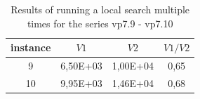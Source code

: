 \documentclass{ifacconf}
\begin{document}
\begin{table}[ht]
	\centering
	\begin{tabular}{|c|c|c|c|}
		\hline
		\hspace*{0.1cm}instance \hspace*{0.1cm} &
		\hspace*{0.1cm}$V1$\hspace*{0.1cm}&
		\hspace*{0.1cm}$V2$\hspace*{0.1cm}&
		\hspace*{0.1cm}$V1/V2$\hspace*{0.1cm}\\
		\hline
		9  & 6,50E+03  &  1,00E+04  &  0,65\\
		10 & 9,95E+03  &  1,46E+04  &  0,68\\
		\hline
	\end{tabular}
	\caption{Results of running a local search multiple times for the series vp7.9 - vp7.10}	\label{spher_vp7}
\end{table}
\end{document}

